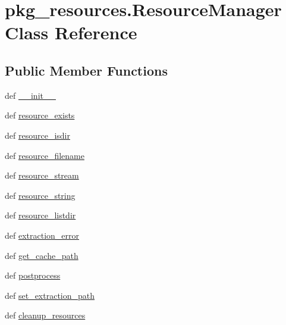 \hypertarget{classpkg__resources_1_1ResourceManager}{}\section{pkg\+\_\+resources.\+Resource\+Manager Class Reference}
\label{classpkg__resources_1_1ResourceManager}
\subsection*{Public Member Functions}
\begin{DoxyCompactItemize}
\item 
def \hyperlink{classpkg__resources_1_1ResourceManager_a5e071ae95669bdc091f01f904de5ef25}{\+\_\+\+\_\+init\+\_\+\+\_\+}
\item 
def \hyperlink{classpkg__resources_1_1ResourceManager_ad4ed2a9a40dd18fdbbddd8effbb80282}{resource\+\_\+exists}
\item 
def \hyperlink{classpkg__resources_1_1ResourceManager_a387f33b966cafb0466c00798393955ca}{resource\+\_\+isdir}
\item 
def \hyperlink{classpkg__resources_1_1ResourceManager_ab4fcfdde890b85e00a227a21dabd650b}{resource\+\_\+filename}
\item 
def \hyperlink{classpkg__resources_1_1ResourceManager_a5814697c16fcb6c955fdee40a9da45e3}{resource\+\_\+stream}
\item 
def \hyperlink{classpkg__resources_1_1ResourceManager_af20a4e06efd557d50ba76fcb18db0b82}{resource\+\_\+string}
\item 
def \hyperlink{classpkg__resources_1_1ResourceManager_aa8108ebfd84e546ea40105d6179db2ea}{resource\+\_\+listdir}
\item 
def \hyperlink{classpkg__resources_1_1ResourceManager_ace89d53444aaa9b47ef7a3554d631b3a}{extraction\+\_\+error}
\item 
def \hyperlink{classpkg__resources_1_1ResourceManager_aaaa00e9435b58e28cca92ff38676d3af}{get\+\_\+cache\+\_\+path}
\item 
def \hyperlink{classpkg__resources_1_1ResourceManager_a4486498607ad84aabccde2a3d5e3260a}{postprocess}
\item 
def \hyperlink{classpkg__resources_1_1ResourceManager_a29647fe8178fe66f77cb57e6696036b8}{set\+\_\+extraction\+\_\+path}
\item 
def \hyperlink{classpkg__resources_1_1ResourceManager_a47a3939571eace7295ad02b5baea1813}{cleanup\+\_\+resources}
\end{DoxyCompactItemize}
